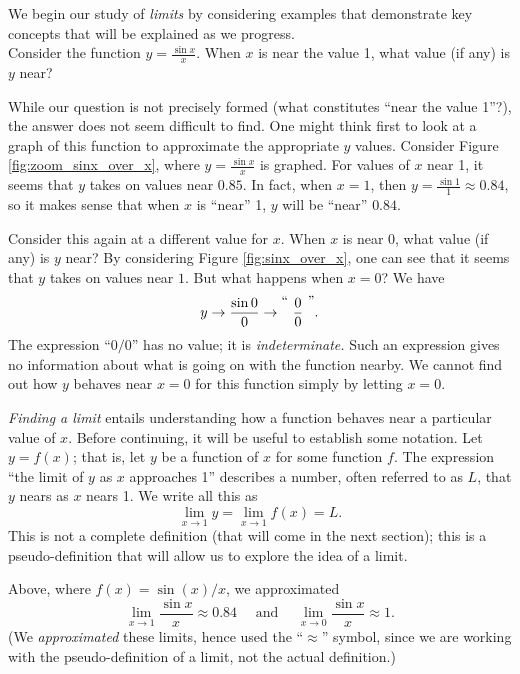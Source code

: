 We begin our study of \textit{limits} by considering examples that demonstrate key concepts that will be explained as we progress.\\

Consider the function $y = \frac{\sin x}{x}$. When $x$ is near the value 1, what value (if any) is $y$ near?%


While our question is not precisely formed (what constitutes ``near the value 1''?), the answer does not seem difficult to find. One might think first to look at a graph of this function to approximate the appropriate $y$ values. Consider Figure \ref{fig:zoom_sinx_over_x}, where $y = \frac{\sin x}{x}$ is graphed. For values of $x$ near 1, it seems that $y$ takes on values near $0.85$. In fact, when $x=1$, then $y=\frac{\sin 1}{1} \approx 0.84$, so it makes sense that when $x$ is ``near'' 1, $y$ will be ``near'' $0.84$.

Consider this again at a different value for $x$. When $x$ is near 0, what value (if any) is $y$ near? By considering Figure \ref{fig:sinx_over_x}, one can see that it seems that $y$ takes on values near $1$. But what happens when $x=0$? We have $$ y \rightarrow \frac{\sin 0}{0} \rightarrow \raisebox{8pt}{\text{``\ }}\frac{0}{0}\raisebox{8pt}{\text{\ ''}}.$$ 
The expression ``$0/0$'' has no value; it is \textit{indeterminate.} Such an expression gives no information about what is going on with the function nearby. We cannot find out how $y$ behaves near $x=0$ for this function simply by letting $x=0$. 

\textit{Finding a limit} entails understanding how a function behaves near a particular value of $x$. Before continuing, it will be useful to establish some notation. Let $y=f(x)$; that is, let $y$ be a function of $x$ for some function $f$. The expression ``the limit of $y$ as $x$ approaches 1'' describes a number, often referred to as $L$, that $y$ nears as $x$ nears 1. We write all this as $$\lim_{x\to 1} y = \lim_{x\to 1} f(x) = L.$$ This is not a complete definition (that will come in the next section); this is a pseudo-definition that will allow us to explore the idea of a limit.

Above, where $f(x) = \sin(x)/x$, we approximated $$\lim_{x\to 1} \frac{\sin x}{x} \approx 0.84 \quad \text{ and } \quad \lim_{x\to 0}\frac{\sin x}{x} \approx 1.$$ (We \textit{approximated} these limits, hence used the ``$\approx$'' symbol, since we are working with the pseudo-definition of a limit, not the actual definition.)

